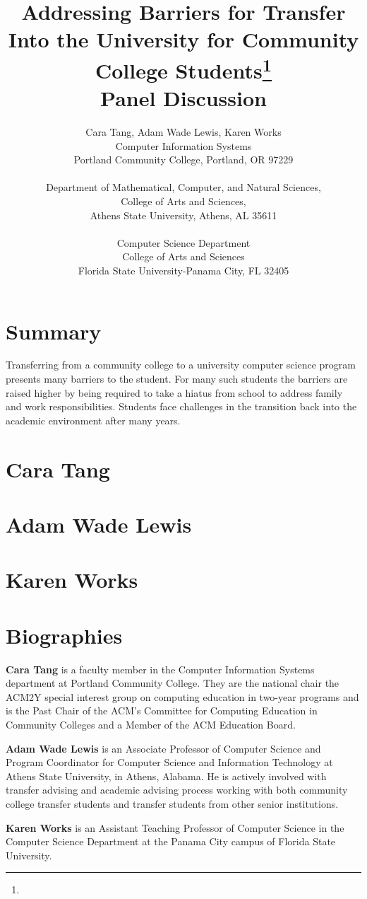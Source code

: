 \documentclass{article}
\title{Addressing Barriers for Transfer Into the University for Community College
  Students\footnote{\protect}
\\
\vspace{0.2in}
\large Panel Discussion
}
\author{
Cara Tang\affmark[1], Adam Wade Lewis\affmark[2], Karen Works\affmark[3]\\
\affmark[1]Computer Information Systems\\
Portland Community College, Portland, OR 97229\\
\email{cara.tang@pcc.edu}\\
\affmark[2]Department of Mathematical, Computer, and Natural Sciences,\\
College of Arts and Sciences,\\
Athens State University, Athens, AL 35611\\
\email{Adam.Lewis@athens.edu}\\
Computer Science Department\\
College of Arts and Sciences\\
Florida State University-Panama City, FL 32405\\
\email{keworks@fsu.edu}
}
\begin{document}
\maketitle

\section{Summary}
Transferring from a community college to a university computer science
program presents many barriers to the student.  For many such students
the barriers are raised higher by being required to take a hiatus from
school to address family and work responsibilities. Students face
challenges in the transition back into the academic environment after
many years.


\section{Cara Tang}

\section{Adam Wade Lewis}

\section{Karen Works}

\section{Biographies}
\textbf{Cara Tang} is a faculty member in the Computer Information
Systems department at Portland Community College.   They are the
national chair the ACM2Y special interest group on computing education
in two-year programs and is the Past Chair of the ACM's Committee for
Computing Education in Community Colleges and a Member of the ACM
Education Board.

\noindent
\textbf{Adam Wade Lewis} is an Associate Professor of Computer Science
and Program Coordinator for Computer Science and Information Technology
at Athens State University, in Athens, Alabama.  He is actively involved
with transfer advising and academic advising process working with both
community college transfer students and transfer students from other
senior institutions.

\noindent
\textbf{Karen Works} is an Assistant Teaching Professor of Computer
Science in the Computer Science Department at the Panama City campus of
Florida State University.  
\end{document}
